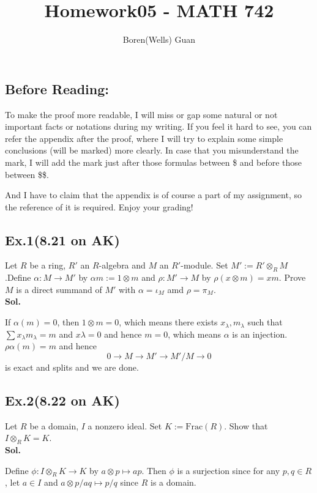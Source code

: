 \documentclass[lang=en,11pt,a4paper,citestyle =authoryear]{elegantpaper}
\title{Homework05 - MATH 742}
\author{Boren(Wells) Guan}
\begin{document}
\maketitle

\subsection*{Before Reading:}\par
To make the proof more readable, I will miss or gap some natural or not important facts or notations during my writing. If you feel it hard to see, you can refer the appendix after the proof, where I will try to explain some simple conclusions (will be marked) more clearly. In case that you misunderstand the mark, I will add the mark just after those formulas between \$ and before those between \$\$.\par
And I have to claim that the appendix is of course a part of my assignment, so the reference of it is required. Enjoy your grading!

\subsection*{Ex.1(8.21 on AK)} 
Let $R$ be a ring, $R'$ an $R$-algebra and $M$ an $R'$-module. Set $M':= R'\otimes_R M$.Define $\alpha:M\to M'$ by $\alpha m:= 1\otimes m$ and $\rho:M'\to M$ by $\rho(x\otimes m) = xm$. Prove $M$ is a direct summand of $M'$ with $\alpha = \iota_M$ amd $\rho = \pi_M$.
\vspace{0.5em}\\
\textbf{Sol.} \par
If $\alpha(m) = 0$, then $1\otimes m = 0$, which means there exists $x_{\lambda}, m_{\lambda}$ such that $\sum\limits x_{\lambda}m_{\lambda} = m$ and $x\lambda = 0$ and hence $m = 0$, which means $\alpha$ is an injection. $\rho\alpha(m) = m$ and hence
\[0 \to M \to M' \to M'/M \to 0 \]
is exact and splits and we are done.
\par 
\vspace{0.5em}

\subsection*{Ex.2(8.22 on AK)} 
Let $R$ be a domain, $I$ a nonzero ideal. Set $K:=\text{Frac}(R)$. Show that $I\otimes_R K = K$.
\vspace{0.5em}\\
\textbf{Sol.} \par
Define $\phi: I\otimes_R K \to K$ by $a\otimes p \mapsto ap$. Then $\phi$ is a surjection since for any $p,q\in R$, let $a\in I$ and $a\otimes p/aq \mapsto p/q$ since $R$ is a domain.
\par 
\vspace{0.5em}
\end{document}

